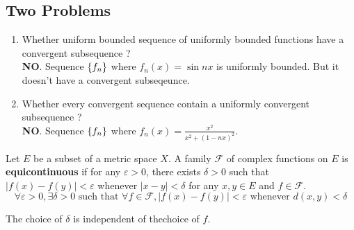 \subsection{Two Problems}
\begin{enumerate}
	\item Whether uniform bounded sequence of uniformly bounded functions have a convergent subsequence ?\\
		\textbf{NO}.
		Sequence $\left\{f_n\right\}$ where $f_n(x) = \sin nx$ is uniformly bounded.
		But it doesn't have a convergent subseqeunce.
	\item Whether every convergent sequence contain a  uniformly convergent subsequence ?\\
		\textbf{NO}.
		Sequence $\left\{f_n\right\}$ where $\displaystyle f_n(x) = \frac{x^2}{x^2+(1-nx)^2}$.
\end{enumerate}

\begin{definition}
	Let $E$ be a subset of a metric space $X$.
	A family $\mathscr{F}$ of complex functions on $E$ is \textbf{equicontinuous} if for any $\varepsilon > 0$, there exists $\delta > 0$ such that $|f(x)-f(y)| < \varepsilon$ whenever $|x-y| < \delta$ for any $x,y \in E$ and $f \in \mathscr{F}$.
	\[ \forall \varepsilon > 0, \exists \delta > 0 \text{ such that } \forall f \in \mathscr{F}, |f(x)-f(y)| < \varepsilon \text{ whenever } d(x,y) < \delta \]
	\begin{commentary}
		The choice of $\delta$ is independent of thechoice of $f$.
	\end{commentary}
\end{definition}

